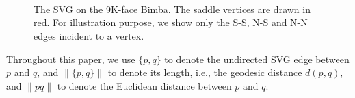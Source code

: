 \begin{figure}[htbp]
\begin{minipage}[t]{0.7\textwidth}
    {   \setlength{\fboxsep}{0pt} \setlength{\fboxrule}{1pt} }\\
        \\
   {   \setlength{\fboxsep}{0pt} \setlength{\fboxrule}{1pt} }
   {   \setlength{\fboxsep}{0pt} \setlength{\fboxrule}{1pt} }\\
      
\end{minipage}
\vspace{-0.1in} \caption{The SVG on the $9$K-face Bimba. The saddle
vertices are drawn in red. For illustration purpose, we show only
the S-S, N-S and N-N edges incident to a vertex. } \label{fig:svg}
\end{figure}

Throughout this paper, we use $\{p,q\}$ to denote the undirected SVG
edge between $p$ and $q$, and $\|\{p,q\}\|$ to denote its length,
i.e., the geodesic distance $d(p,q)$, and $\|pq\|$ to denote the
Euclidean distance between $p$ and $q$.


